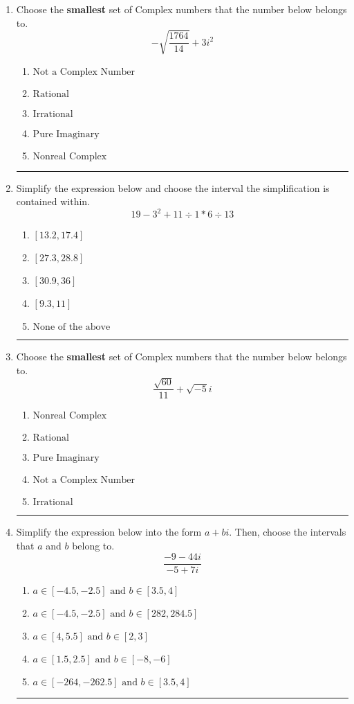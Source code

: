 \documentclass[14pt]{extbook}
\newcommand{\litem}[1]{\item#1\hspace*{-1cm}\rule{\textwidth}{0.4pt}}
\begin{document}
\begin{enumerate}
\litem{
Choose the \textbf{smallest} set of Complex numbers that the number below belongs to.\[ -\sqrt{\frac{1764}{14}}+3i^2 \]\begin{enumerate}[label=\Alph*.]
\item \( \text{Not a Complex Number} \)
\item \( \text{Rational} \)
\item \( \text{Irrational} \)
\item \( \text{Pure Imaginary} \)
\item \( \text{Nonreal Complex} \)

\end{enumerate} }
\litem{
Simplify the expression below and choose the interval the simplification is contained within.\[ 19 - 3^2 + 11 \div 1 * 6 \div 13 \]\begin{enumerate}[label=\Alph*.]
\item \( [13.2, 17.4] \)
\item \( [27.3, 28.8] \)
\item \( [30.9, 36] \)
\item \( [9.3, 11] \)
\item \( \text{None of the above} \)

\end{enumerate} }
\litem{
Choose the \textbf{smallest} set of Complex numbers that the number below belongs to.\[ \frac{\sqrt{60}}{11}+\sqrt{-5}i \]\begin{enumerate}[label=\Alph*.]
\item \( \text{Nonreal Complex} \)
\item \( \text{Rational} \)
\item \( \text{Pure Imaginary} \)
\item \( \text{Not a Complex Number} \)
\item \( \text{Irrational} \)

\end{enumerate} }
\litem{
Simplify the expression below into the form $a+bi$. Then, choose the intervals that $a$ and $b$ belong to.\[ \frac{-9 - 44 i}{-5 + 7 i} \]\begin{enumerate}[label=\Alph*.]
\item \( a \in [-4.5, -2.5] \text{ and } b \in [3.5, 4] \)
\item \( a \in [-4.5, -2.5] \text{ and } b \in [282, 284.5] \)
\item \( a \in [4, 5.5] \text{ and } b \in [2, 3] \)
\item \( a \in [1.5, 2.5] \text{ and } b \in [-8, -6] \)
\item \( a \in [-264, -262.5] \text{ and } b \in [3.5, 4] \)


\end{enumerate}}
\end{enumerate}
\end{document}
